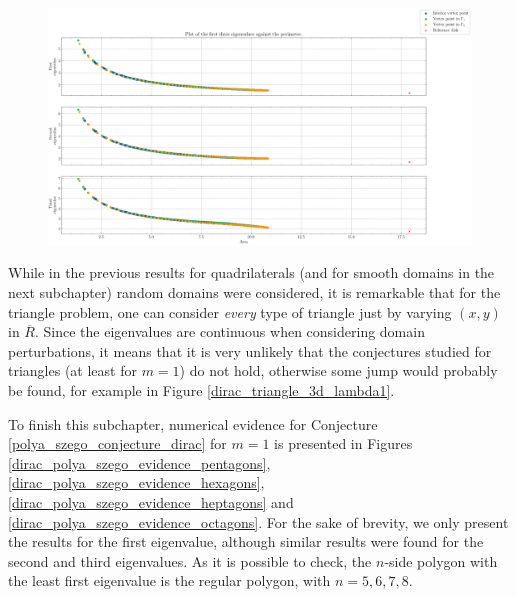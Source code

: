 \begin{figure}[!htb]
    \centering
    \includegraphics[width=\linewidth]{Images/Dirac/triangles/triangle_perimeter_first_eigenvalues.png}
    \label{dirac_triangle_model_perimeter}
\end{figure}

While in the previous results for quadrilaterals (and for smooth domains in the next subchapter) random domains were considered, it is remarkable that for the triangle problem, one can consider \textit{every} type of triangle just by varying \((x,y)\) in \(\overline{R}\). Since the eigenvalues are continuous when considering domain perturbations, it means that it is very unlikely that the conjectures studied for triangles (at least for \(m=1\)) do not hold, otherwise some jump would probably be found, for example in Figure \ref{dirac_triangle_3d_lambda1}. 

To finish this subchapter, numerical evidence for Conjecture \ref{polya_szego_conjecture_dirac} for \(m=1\) is presented in Figures \ref{dirac_polya_szego_evidence_pentagons}, \ref{dirac_polya_szego_evidence_hexagons}, \ref{dirac_polya_szego_evidence_heptagons} and \ref{dirac_polya_szego_evidence_octagons}. For the sake of brevity, we only present the results for the first eigenvalue, although similar results were found for the second and third eigenvalues. As it is possible to check, the \(n\)-side polygon with the least first eigenvalue is the regular polygon, with \(n=5,6,7,8\).


